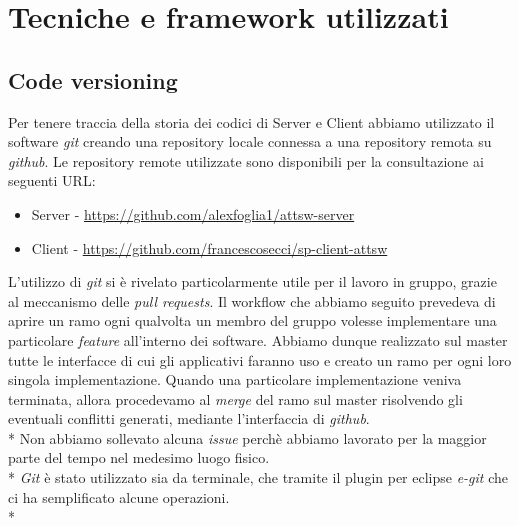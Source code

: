 \chapter{Tecniche e framework utilizzati}
\section{Code versioning}
Per tenere traccia della storia dei codici di Server e Client abbiamo utilizzato il software \emph{git} creando una repository locale connessa a una repository remota su \emph{github}. Le repository remote utilizzate sono disponibili per la consultazione ai seguenti URL:
\begin{itemize}
	\item Server - \url{https://github.com/alexfoglia1/attsw-server}
	\item Client - \url{https://github.com/francescosecci/sp-client-attsw}
\end{itemize}
L'utilizzo di \emph{git} si \`e rivelato particolarmente utile per il lavoro in gruppo, grazie al meccanismo delle \emph{pull requests}. Il workflow che abbiamo seguito prevedeva di aprire un ramo ogni qualvolta un membro del gruppo volesse implementare una particolare \emph{feature} all'interno dei software. Abbiamo dunque realizzato sul master tutte le interfacce di cui gli applicativi faranno uso e creato un ramo per ogni loro singola implementazione. Quando una particolare implementazione veniva terminata, allora procedevamo al \emph{merge} del ramo sul master risolvendo gli eventuali conflitti generati, mediante l'interfaccia di \emph{github}.\\*
Non abbiamo sollevato alcuna \emph{issue} perch\`e abbiamo lavorato per la maggior parte del tempo nel medesimo luogo fisico.\\*
\emph{Git} \`e stato utilizzato sia da terminale, che tramite il plugin per eclipse \emph{e-git} che ci ha semplificato alcune operazioni.\\*
